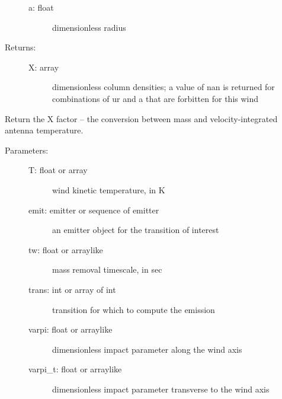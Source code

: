 \documentclass[letterpaper,10pt,english]{sphinxmanual}
\begin{document}
\begin{fulllineitems}
\begin{fulllineitems}
\begin{description}
\begin{description}
\item[{a: float}] \leavevmode
dimensionless radius

\end{description}

\item[{Returns:}] \leavevmode\begin{description}
\item[{X: array}] \leavevmode
dimensionless column densities; a value of nan is
returned for combinations of ur and a that are forbitten
for this wind

\end{description}

\end{description}

\end{fulllineitems}


\begin{fulllineitems}
\label{fulldoc:despotic.winds.pwind.Xfac}
Return the X factor -- the conversion between mass and
velocity-integrated antenna temperature.
\begin{description}
\item[{Parameters:}] \leavevmode\begin{description}
\item[{T: float or array}] \leavevmode
wind kinetic temperature, in K

\item[{emit: emitter or sequence of emitter}] \leavevmode
an emitter object for the transition of interest

\item[{tw: float or arraylike}] \leavevmode
mass removal timescale, in sec

\item[{trans: int or array of int}] \leavevmode
transition for which to compute the emission

\item[{varpi: float or arraylike}] \leavevmode
dimensionless impact parameter along the wind axis

\item[{varpi\_t: float or arraylike}] \leavevmode
dimensionless impact parameter transverse to the wind axis


\end{description}
\end{description}
\end{fulllineitems}
\end{fulllineitems}
\end{document}
